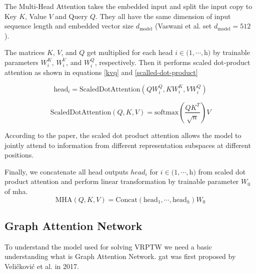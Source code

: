             The Multi-Head Attention takes the embedded input and split the input copy to Key $K$, Value $V$ and Query $Q$. They all have the same dimension of input sequence length and embedded vector size $d_{\text{model}}$ (Vaswani et al. set $d_{\text{model}}=512$ \cite{attention-is-all}).
            
            The matrices $K$, $V$, and $Q$ get multiplied for each head $i \in (1, \cdots, $h$)$ by trainable parameters $W_i^K$, $W_i^V$, and $W_i^Q$, respectively. Then it performs scaled dot-product attention as shown in equations \ref{kvq} and \ref{scalled-dot-product}
            
            \begin{equation}\label{kvq}
                \text{head}_i = \text{ScaledDotAttention}(Q W_i^Q, K W_i^K, V W_i^Q)
            \end{equation}
            
            \begin{equation}\label{scalled-dot-product}
                \text{ScaledDotAttention}(Q, K, V) = \text{softmax}(\dfrac{Q K^T}{\sqrt{n}}) V
            \end{equation}
            
            According to the paper\cite{attention-is-all}, the scaled dot product attention allows the model to jointly attend to information from different representation subspaces at different positions.
            
            Finally, we concatenate all head outputs $head_i$ for $i \in (1, \cdots, $h$)$ from scaled dot product attention and perform linear transformation by trainable parameter $W_0$ of \gls{mha}.
            \begin{equation}
                \text{MHA}(Q, K, V) = \text{Concat}(\text{head}_1, \cdots, \text{head}_h)W_0
            \end{equation}
            
        \subsection{Graph Attention Network}\label{graph-attention-network}
        To understand the model used for solving \gls{VRPTW} we need a basic understanding what is Graph Attention Network.
        \gls{gat} was first proposed by Veličković et al. \cite{gat} in 2017.
    
    

